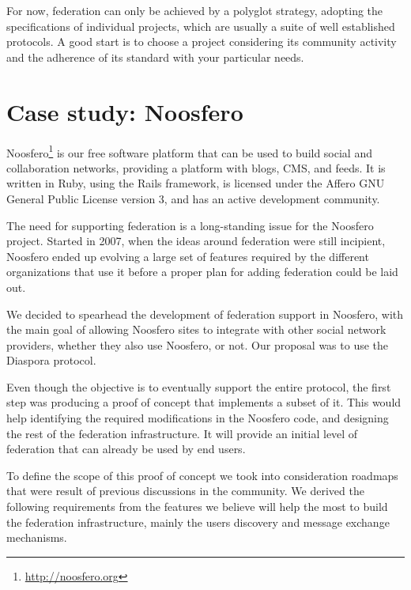 For now, federation can only be achieved by a polyglot strategy, adopting
the specifications of individual projects, which are usually a suite of
well established protocols. A good start is to choose a project
considering its community activity and the adherence of its standard
with your particular needs.

\section{Case study: Noosfero}

Noosfero\footnote{\url{http://noosfero.org}} is our free software
platform that can be used to build social and collaboration networks,
providing a platform with blogs, CMS, and feeds. It is written in Ruby,
using the Rails framework, is licensed under the Affero GNU General
Public License version 3, and has an active development community.

The need for supporting federation is a long-standing issue for the
Noosfero project. Started in 2007, when the ideas around federation were
still incipient, Noosfero ended up evolving a large set of features
required by the different organizations that use it before a proper
plan for adding federation could be laid out.

We decided to spearhead the development of federation support in
Noosfero, with the main goal of allowing Noosfero sites to integrate with
other social network providers, whether they also use Noosfero, or
not. Our proposal was to use the Diaspora protocol.

Even though the objective is to eventually support the entire protocol,
the first step was producing a proof of concept that implements a subset
of it. This would help identifying the required modifications in the
Noosfero code, and designing the rest of the federation infrastructure.
It will provide an initial level of federation that can already be
used by end users.

To define the scope of this proof of concept we took into consideration
roadmaps that were result of previous discussions in the community. We derived
the following requirements from the features we believe will help the most to
build the federation infrastructure, mainly the users discovery and message
exchange mechanisms.

